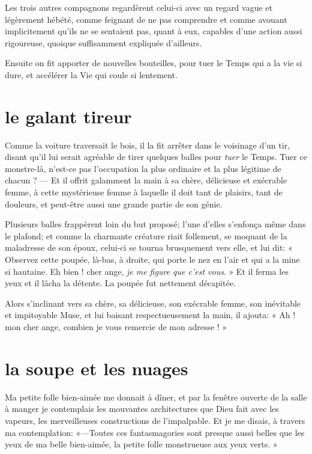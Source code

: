 Les trois autres compagnons regardèrent celui{}-ci avec un regard vague
et légèrement hébété, comme feignant de ne pas comprendre et comme
avouant implicitement qu’ils ne se sentaient pas,
quant à eux, capables d’une action aussi rigoureuse,
quoique suffisamment expliquée d’ailleurs.

Ensuite on fit apporter de nouvelles bouteilles, pour tuer le Temps qui
a la vie si dure, et accélérer la Vie qui coule si lentement.

\quebra\section[Le galant tireur]{le galant tireur }

Comme la voiture traversait le bois, il la fit arrêter dans le voisinage
d’un tir, disant qu’il lui serait
agréable de tirer quelques balles pour \textit{tuer} le Temps. Tuer ce
monstre{}-là, n’est{}-ce pas
l’occupation la plus ordinaire et la plus légitime de
chacun ? --- Et il offrit galamment la main à sa chère, délicieuse et
exécrable femme, à cette mystérieuse femme à laquelle il doit tant de
plaisirs, tant de douleurs, et peut{}-être aussi une grande partie de
son génie.

Plusieurs balles frappèrent loin du but proposé; l’une
d’elles s’enfonça même dans le
plafond; et comme la charmante créature riait follement, se moquant de
la maladresse de son époux, celui{}-ci se tourna brusquement vers elle,
et lui dit: « Observez cette poupée, là{}-bas, à droite, qui porte le
nez en l’air et qui a la mine si hautaine. Eh bien !
cher ange, \textit{je me figure que c’est vous}. » Et il ferma
les yeux et il lâcha la détente. La poupée fut nettement décapitée.

Alors s’inclinant vers sa chère, sa délicieuse, son
exécrable femme, son inévitable et impitoyable Muse, et lui baisant
respectueusement la main, il ajouta: « Ah ! mon cher ange, combien je
vous remercie de mon adresse ! »


\quebra\section[La soupe et les nuages]{la soupe et les nuages}

Ma petite folle bien{}-aimée me donnait à dîner, et par la fenêtre
ouverte de la salle à manger je contemplais les mouvantes architectures
que Dieu fait avec les vapeurs, les merveilleuses constructions de
l’impalpable. Et je me disais, à travers ma
contemplation: «---Toutes ces fantasmagories sont presque aussi belles
que les yeux de ma belle bien{}-aimée, la petite folle monstrueuse aux
yeux verts. »

